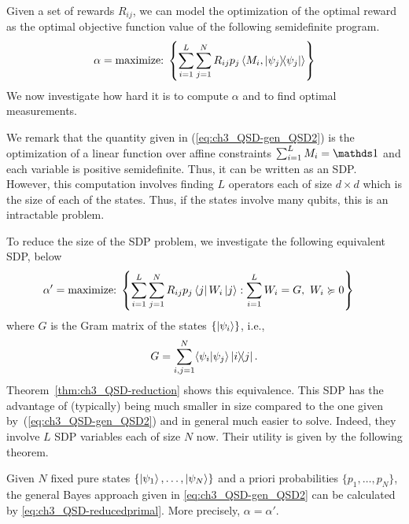 Given a set of rewards $R_{ij}$, we can model the optimization of the optimal reward as the optimal objective function value of the following semidefinite program.
\begin{align}
    \label{eq:ch3_QSD-gen_QSD2}
    \alpha = \text{maximize:} \;  \left\{ \sum_{i=1}^L \sum_{j=1}^N R_{ij} p_j  \left\langle M_i, \ketbra{\psi_j} \right\rangle \right\}   
\end{align} 
We now investigate how hard it is to compute $\alpha$ and to find optimal measurements.  

We remark that the quantity given in (\ref{eq:ch3_QSD-gen_QSD2}) is the optimization of a linear function over affine constraints $\sum_{i=1}^L M_i = \id$ and each variable is positive semidefinite. 
Thus, it can be written as an SDP.
However, this computation involves finding $L$ operators each of size $d \times d$ which is the size of each of the states. 
Thus, if the states involve many qubits, this is an intractable problem. 

To reduce the size of the SDP problem, we investigate the following equivalent SDP, below  
\begin{align} 
    \alpha' & = \text{maximize:} \;
        \left\{ 
            \sum_{i=1}^L \sum_{j=1}^N R_{ij} p_j \bra{j} W_i \ket{j} : 
            \sum_{i=1}^L W_i = G,\ W_i \succcurlyeq 0 
        \right\} \label{eq:ch3_QSD-reducedprimal}
\end{align}
where $G$ is the Gram matrix of the states $\{\ket{\psi_i}\}$, i.e., 
\begin{equation} 
G = \sum_{i,j=1}^N \langle \psi_i | \psi_j \rangle \ketbra{i}{j}. 
\end{equation} 
Theorem~\ref{thm:ch3_QSD-reduction} shows this equivalence. 
This SDP has the advantage of (typically) being much smaller in size compared to the one given by~(\ref{eq:ch3_QSD-gen_QSD2}) and in general much easier to solve. 
Indeed, they involve $L$ SDP variables each of size $N$ now. 
Their utility is given by the following theorem. 

\begin{theorem} \label{thm:ch3_QSD-reduction} 
Given $N$ fixed pure states $\{ \ket{\psi_1}, \ldots, \ket{\psi_N} \}$ and a priori probabilities $\{p_1, \ldots, p_N\}$, the general Bayes approach given in \eqref{eq:ch3_QSD-gen_QSD2} can be calculated by \eqref{eq:ch3_QSD-reducedprimal}. 
More precisely, $\alpha = \alpha'$.
\end{theorem}

